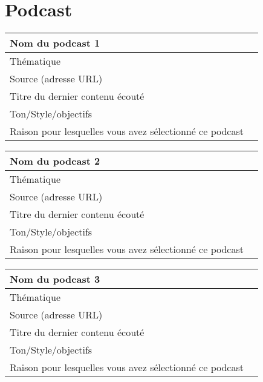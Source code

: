 \documentclass[12pt]{article}
\begin{document}
\section{Podcast}
\begin{tabular}{|m{4cm}|p{13cm}|}
	\hline
	Nom du podcast 1&    \\
	\hline
	Thématique &    \\
	\hline
	Source (adresse URL)   &  \\
	\hline
	Titre du dernier contenu écouté   &  \\
	\hline
	Ton/Style/objectifs & \\
	\hline
	Raison pour lesquelles vous avez sélectionné ce podcast & \\
	\hline
\end{tabular}
\vspace{0.5cm}

\begin{tabular}{|m{4cm}|p{13cm}|}
	\hline
	Nom du podcast 2&    \\
	\hline
	Thématique &    \\
	\hline
	Source (adresse URL)   &  \\
	\hline
	Titre du dernier contenu écouté   &  \\
	\hline
	Ton/Style/objectifs & \\
	\hline
	Raison pour lesquelles vous avez sélectionné ce podcast & \\
	\hline
\end{tabular}
\vspace{0.5cm}

\begin{tabular}{|m{4cm}|p{13cm}|}
	\hline
	Nom du podcast 3 &    \\
	\hline
	Thématique &    \\
	\hline
	Source (adresse URL)   &  \\
	\hline
	Titre du dernier contenu écouté   &  \\
	\hline
	Ton/Style/objectifs & \\
	\hline
	Raison pour lesquelles vous avez sélectionné ce podcast & \\
	\hline
\end{tabular}
\vspace{0.5cm}
\end{document}

